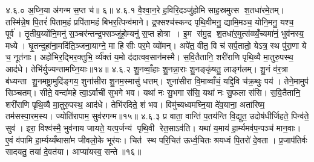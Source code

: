 ४.६.०
अ॒घ्नि॒या अ॑गन्म स॒प्त च॑॥ ६॥
४.६.१
वै॒श्वा॒न॒रे ह॒विरि॒दञ्जु॑होमि साह॒स्रमुत्स श॒तधा॑रमे॒तम्। तस्मि॑न्ने॒ष पि॒तरं॑ पिताम॒हं प्रपि॑तामहं बिभर॒त्पिन्व॑माने। द्र॒फ्सश्च॑स्कन्द पृथि॒वीमनु॒ द्यामि॒मञ्च॒ योनि॒मनु॒ यश्च॒ पूर्व॑। तृ॒तीय॒य्योंनि॒मनु॑ स॒ञ्चर॑न्तन्द्र॒फ्सञ्जु॑हो॒म्यनु॑ स॒प्त होत्रा। इ॒म स॑मु॒द्र श॒तधा॑र॒मुत्स॑व्व्यँ॒च्यमा॑नं॒ भुव॑नस्य॒ मध्ये। घृ॒तन्दुहा॑ना॒मदि॑ति॒ञ्जना॒याग्ने॒ मा हिसीः पर॒मे व्यो॑मन्। अपे॑त॒ वीत॒ वि च॑ सर्प॒तातो॒ येऽत्र॒ स्थ पु॑रा॒णा ये च॒ नूत॑नाः। अहो॑भिर॒द्भिर॒क्तुभि॒ र्व्य॑क्तं य॒मो द॑दात्वव॒सान॑मस्मै। स॒वि॒तैतानि॒ शरी॑राणि पृथि॒व्यै मा॒तुरु॒पस्थ॒ आद॑धे। तेभि॑र्युज्यन्तामघ्नि॒याः॥१४॥
४.६.२
शु॒नव्वाँ॒हाः  शु॒नन्ना॒राः  शु॒नङ्कृ॑षतु॒ लाङ्ग॑लम्। शु॒नं व॑र॒त्रा ब॑ध्यन्ता शु॒नमष्ट्रा॒मुदि॑ङ्गय॒ शुना॑सीरा शु॒नम॒स्मासु॑ धत्तम्। शुना॑सीरा वि॒माव्वाँचं॒ यद्दि॒वि च॑क्र॒थुः पय॑। तेने॒मामुप॑ सिञ्चतम्। सीते॒ वन्दा॑महे त्वा॒ऽर्वाची॑ सुभगे भव। यथा॑ नः सु॒भगा स॑सि॒ यथा॑ नः सु॒फला स॑सि। स॒वि॒तैतानि॒ शरी॑राणि पृथि॒व्यै मा॒तुरु॒पस्थ॒ आद॑धे। तेभि॑रदिते॒ शं भव। विमु॑च्यध्वमघ्नि॒या दे॑व॒याना॒ अता॑रिष्म॒ तम॑सस्पा॒रम॒स्य। ज्योति॑रापाम॒ सुव॑रगन्म॥१५॥
४.६.३
प्र वाता॒ वान्ति॑ प॒तय॑न्ति वि॒द्युत॒ उदोष॑धीर्जिहते॒ पिन्व॑ते॒ सुव॑। इरा॒ विश्व॑स्मै॒ भुव॑नाय जायते॒ यत्प॒र्जन्य॑ पृथि॒वी रेत॒साऽव॑ति। यथा॑ य॒माय॑ हा॒र्म्यमव॑प॒न्पञ्च॑ मान॒वाः। ए॒वं व॑पामि हा॒र्म्यय्यँथासा॑म जीवलो॒के भूर॑यः। चित॑ स्थ परि॒चित॑ ऊर्ध्व॒चितः  श्रयध्वं पि॒तरो॑ दे॒वता। प्र॒जाप॑तिर्वः सादयतु॒ तया॑ दे॒वत॑या। आप्या॑यस्व॒ सन्ते॥१६॥
\anuvakamend

